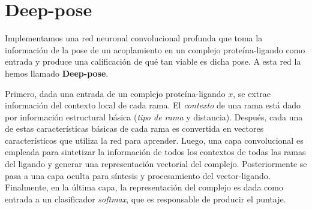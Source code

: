 \section{Deep-pose}
Implementamos una red neuronal convolucional profunda que toma
la información de la pose de un acoplamiento en un complejo
proteína-ligando como entrada y produce una calificación de qué tan
viable es dicha pose. A esta red la hemos llamado \textbf{Deep-pose}.

Primero, dada una entrada de un complejo proteína-ligando $x$, se
extrae información del contexto local de cada rama. El
\textit{contexto} de una rama está dado por información estructural
básica (\textit{tipo de rama} y distancia). Después, cada una de estas
características básicas de cada rama es convertida en vectores
característicos que utiliza la red para aprender. Luego, una capa
convolucional es empleada para sintetizar la información de todos los
contextos de todas las ramas del ligando y generar una representación
vectorial del complejo. Posteriormente se pasa a una capa oculta para
síntesis y procesamiento del vector-ligando. Finalmente, en la última
capa, la representación del complejo es dada como entrada a un
clasificador \textit{softmax}, que es responsable de producir el
puntaje.

